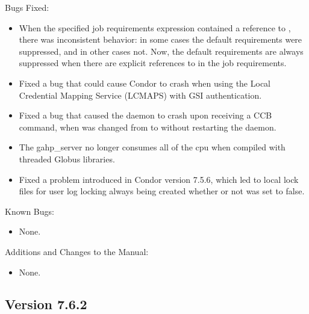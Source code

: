 \noindent Bugs Fixed:

\begin{itemize}

\item When the specified job requirements expression contained a
reference to , there was inconsistent behavior:
in some cases the default  requirements were
suppressed, and in other cases not.  Now, the default
 requirements are always suppressed when there
are explicit references to  in the job
requirements.

\item Fixed a bug that could cause Condor to crash when using 
the Local Credential Mapping Service (LCMAPS) with
GSI authentication.

\item Fixed a bug that caused the  daemon to crash
upon receiving a CCB command,
when  was changed from  to 
without restarting the daemon.

\item The gahp\_server no longer consumes all of the cpu when compiled
with threaded Globus libraries.

\item Fixed a problem introduced in Condor version 7.5.6, which led to 
local lock files for user log locking always being created whether or 
not  was set to false.


\end{itemize}

\noindent Known Bugs:

\begin{itemize}

\item None.

\end{itemize}

\noindent Additions and Changes to the Manual:

\begin{itemize}

\item None.

\end{itemize}


\subsection*{\label{sec:New-7-6-2}Version 7.6.2}

